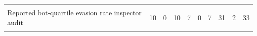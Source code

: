 {\begin{tabular}{l*{9}{c}}
            &                     &                     &                     &                     &                     &                     &                     &                     &                     \\
Reported bot-quartile  evasion rate  inspector audit&          10         &           0         &          10         &           7         &           0         &           7         &          31         &           2         &          33         \\
            &                     &                     &                     &                     &                     &                     &                     &                     &                     \\
\bottomrule
\end{tabular}
}
